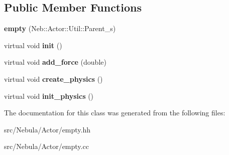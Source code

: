 \subsection*{\-Public \-Member \-Functions}
\begin{DoxyCompactItemize}
\item 
\hypertarget{classNeb_1_1Actor_1_1empty_a1388e7d1394749a2b6e6598ef69cb7bf}{{\bfseries empty} (\-Neb\-::\-Actor\-::\-Util\-::\-Parent\-\_\-s)}\label{classNeb_1_1Actor_1_1empty_a1388e7d1394749a2b6e6598ef69cb7bf}

\item 
\hypertarget{classNeb_1_1Actor_1_1empty_a6309e078d4d8a45b9316d55b387111d7}{virtual void {\bfseries init} ()}\label{classNeb_1_1Actor_1_1empty_a6309e078d4d8a45b9316d55b387111d7}

\item 
\hypertarget{classNeb_1_1Actor_1_1empty_ae38621f3ae057ad375ca92af3711a98c}{virtual void {\bfseries add\-\_\-force} (double)}\label{classNeb_1_1Actor_1_1empty_ae38621f3ae057ad375ca92af3711a98c}

\item 
\hypertarget{classNeb_1_1Actor_1_1empty_a76ce00f25471d85dd2469a458491ecfd}{virtual void {\bfseries create\-\_\-physics} ()}\label{classNeb_1_1Actor_1_1empty_a76ce00f25471d85dd2469a458491ecfd}

\item 
\hypertarget{classNeb_1_1Actor_1_1empty_a55c552dcd2d7876b36cf54583ea4be3d}{virtual void {\bfseries init\-\_\-physics} ()}\label{classNeb_1_1Actor_1_1empty_a55c552dcd2d7876b36cf54583ea4be3d}

\end{DoxyCompactItemize}


\-The documentation for this class was generated from the following files\-:\begin{DoxyCompactItemize}
\item 
src/\-Nebula/\-Actor/empty.\-hh\item 
src/\-Nebula/\-Actor/empty.\-cc\end{DoxyCompactItemize}
